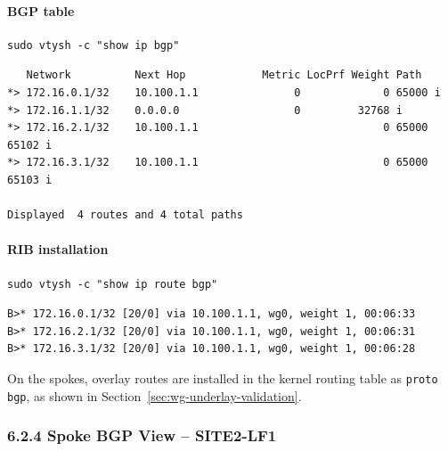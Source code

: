 \documentclass[11pt]{article}
\begin{document}
\paragraph{BGP table}

\begin{verbatim}
sudo vtysh -c "show ip bgp"
\end{verbatim}

\begin{verbatim}
   Network          Next Hop            Metric LocPrf Weight Path
*> 172.16.0.1/32    10.100.1.1               0             0 65000 i
*> 172.16.1.1/32    0.0.0.0                  0         32768 i
*> 172.16.2.1/32    10.100.1.1                             0 65000 65102 i
*> 172.16.3.1/32    10.100.1.1                             0 65000 65103 i

Displayed  4 routes and 4 total paths
\end{verbatim}

\paragraph{RIB installation}

\begin{verbatim}
sudo vtysh -c "show ip route bgp"
\end{verbatim}

\begin{verbatim}
B>* 172.16.0.1/32 [20/0] via 10.100.1.1, wg0, weight 1, 00:06:33
B>* 172.16.2.1/32 [20/0] via 10.100.1.1, wg0, weight 1, 00:06:31
B>* 172.16.3.1/32 [20/0] via 10.100.1.1, wg0, weight 1, 00:06:28
\end{verbatim}

On the spokes, overlay routes are installed in the kernel routing table as \texttt{proto bgp}, as shown in Section~\ref{sec:wg-underlay-validation}.

%
%
%
\subsubsection{6.2.4 Spoke BGP View -- SITE2-LF1}
\label{sec:bgp-overlay-spoke-site2}
\end{document}

